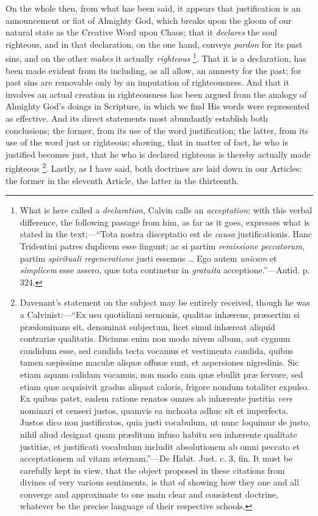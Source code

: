 On the whole then, from what has been said, it appears that
justification is an announcement or fiat of Almighty God, which breaks
upon the gloom of our natural state as the Creative Word upon Chaos;
that it \emph{declares} the soul righteous, and in that declaration,
on the one hand, conveys \emph{pardon} for its past sins, and on the
other \emph{makes} it actually \emph{righteous} \footnote{What is here
called a \emph{declaration}, Calvin calls an \emph{acceptation}; with
this verbal difference, the following passage from him, as far as it
goes, expresses what is stated in the text;—``Tota nostra
disceptatio est de \emph{causa} justificationis. Hanc Tridentini
patres duplicem esse fingunt; ac si partim \emph{remissione peccatorum},
partim \emph{spirituali regeneratione} justi essemus … Ego autem \emph{unicam}
et \emph{simplicem} esse assero, quæ tota continetur in \emph{gratuita}
acceptione.''—Antid. p. 324.}. That it is a declaration, has been made evident from its
including, as all allow, an amnesty for the past; for past sins are
removable only by an imputation of righteousness. And that it involves
an actual creation in righteousness has been argued from the analogy
of Almighty God's doings in Scripture, in which we find His words were
represented as effective. And its direct statements most abundantly
establish both conclusions; the former, from its use of the word
justification; the latter, from its use of the word just or righteous;
showing, that in matter of fact, he who is justified becomes just,
that he who is declared righteous is thereby actually made righteous \footnote{Davenant's
statement on the subject may be entirely received, though he was a
Calvinist:—``Ex usu quotidiani sermonis, qualitas inhærens,
præsertim si prædominans sit, denominat subjectum, licet simul
inhæreat aliquid contrariæ qualitatis. Dicimus enim non modo nivem
album, aut cygnum candidum esse, sed candida tecta vocamus et
vestimenta candida, quibus tamen sæpissime maculæ aliquæ offusæ
sunt, et aspersiones nigredinis. Sic etiam aquam calidam vocamus, non
modo cam quæ ebullit præ fervore, sed etiam quæ acquisivit gradus
aliquot caloris, frigore nondum totaliter expulso. Ex quibus patet,
eadem ratione renatos omnes ab inhærente justitia \emph{vere}
nominari et censeri justos, quamvis ea inchoata adhuc sit et
imperfecta. Justos dico non justificatos, quia justi vocabulum, ut
nunc loquimur de justo, nihil aliud designat quam præditum infuso
habitu seu inhærente qualitate justitiæ, et justificati vocabulum
includit absolutionem ab omni peccato et acceptationem ad vitam
æternam.''—De Habit. Just. c. 3, fin. It must be carefully kept
in view, that the object proposed in these citations from divines of
very various sentiments, is that of showing how they one and all
converge and approximate to one main clear and consistent doctrine,
whatever be the precise language of their respective schools.}. Lastly, as I have said, both doctrines are laid down in our
Articles: the former in the eleventh Article, the latter in the
thirteenth.

